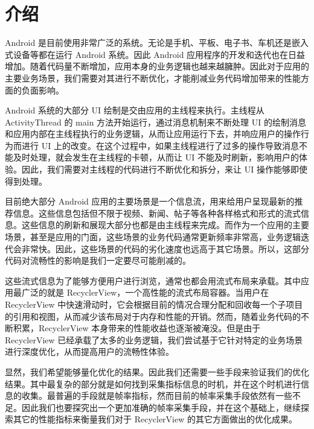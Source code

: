 \chapter{介绍}

Android 是目前使用非常广泛的系统\cite{businge2019studying}。无论是手机、平板、电子书、车机还是嵌入式设备等都在运行 Android 系统。因此 Android 应用程序的开发和迭代也在日益增加。随着代码量不断增加，应用本身的业务逻辑也越来越臃肿。因此对于应用的主要业务场景，我们需要对其进行不断优化，才能削减业务代码增加带来的性能方面的负面影响。

Android 系统的大部分 UI 绘制是交由应用的主线程来执行\cite{yan2014real}。主线程从 ActivityThread 的 main 方法开始运行，通过消息机制来不断处理 UI 的绘制消息和应用内部在主线程执行的业务逻辑，从而让应用运行下去，并响应用户的操作行为而进行 UI 上的改变。在这个过程中，如果主线程进行了过多的操作导致消息不能及时处理，就会发生在主线程的卡顿，从而让 UI 不能及时刷新，影响用户的体验。因此，我们需要对主线程的代码进行不断优化和拆分，来让 UI 操作能够即使得到处理。

目前绝大部分 Android 应用的主要场景是一个信息流，用来给用户呈现最新的推荐信息。这些信息包括但不限于视频、新闻、帖子等各种各样格式和形式的流式信息。这些信息的刷新和展现大部分也都是由主线程来完成。而作为一个应用的主要场景，甚至是应用的门面，这些场景的业务代码通常更新频率非常高，业务逻辑迭代会非常快。因此，这些场景的代码的劣化速度也远高于其它场景。所以，这部分代码对流畅性的影响是我们一定要尽可能削减的。

这些流式信息为了能够方便用户进行浏览，通常也都会用流式布局来承载。其中应用最广泛的就是 RecyclerView，一个高性能的流式布局容器。\cite{sabiyath2020enhanced}当用户在 RecyclerView 中快速滑动时，它会根据目前的情况合理分配和回收每一个子项目的引用和视图，从而减少该布局对于内存和性能的开销。然而，随着业务代码的不断积累，RecyclerView 本身带来的性能收益也逐渐被淹没。但是由于 RecyclerView 已经承载了太多的业务逻辑，我们尝试基于它针对特定的业务场景进行深度优化，从而提高用户的流畅性体验。

显然，我们希望能够量化优化的结果。因此我们还需要一些手段来验证我们的优化结果。其中最复杂的部分就是如何找到采集指标信息的时机，并在这个时机进行信息的收集。最普遍的手段就是帧率指标，然而目前的帧率采集手段依然有一些不足。因此我们也要探究出一个更加准确的帧率采集手段，并在这个基础上，继续探索其它的性能指标来衡量我们对于 RecyclerView 的其它方面做出的优化成果。